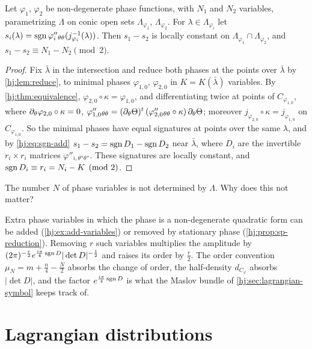 \begin{corollary}\label{hj:cor:signature}
  Let $\varphi_1$, $\varphi_2$ be non-degenerate phase functions, with $N_1$ and
  $N_2$ variables, parametrizing $\Lambda$ on conic open sets
  $\Lambda_{\varphi_1}$, $\Lambda_{\varphi_2}$.  For
  $\lambda\in\Lambda_{\varphi_i}$ let $s_i(\lambda)=\operatorname{sgn}\varphi_i''{}_{\theta\theta}
  (j_{\varphi_i}^{-1}(\lambda))$.  Then $s_1-s_2$ is locally constant on
  $\Lambda_{\varphi_1}\cap\Lambda_{\varphi_2}$, and
  $s_1-s_2\equiv N_1-N_2\pmod 2$.
\end{corollary}
\begin{proof}
  Fix $\bar\lambda$ in the intersection and reduce both phases at the points
  over $\bar\lambda$ by \cref{hj:lem:reduce}, to minimal phases
  $\varphi_{1,0}$, $\varphi_{2,0}$ in $K=K(\bar\lambda)$ variables.  By
  \cref{hj:thm:equivalence}, $\varphi_{2,0}\circ\kappa=\varphi_{1,0}$, and
  differentiating twice at points of $C_{\varphi_{1,0}}$, where
  $\partial_\theta\varphi_{2,0}\circ\kappa=0$,
  $\varphi_{1,0}''{}_{\theta\theta}=(\partial_\theta\Theta)^t\,(\varphi_{2,0}''{}_{\theta\theta}
  \circ\kappa)\,\partial_\theta\Theta$; moreover $j_{\varphi_{2,0}}\circ\kappa=
  j_{\varphi_{1,0}}$ on $C_{\varphi_{1,0}}$.  So the minimal phases have equal
  signatures at points over the same $\lambda$, and by \eqref{hj:eq:sgn-add}
  $s_1-s_2=\operatorname{sgn} D_1-\operatorname{sgn} D_2$ near $\bar\lambda$, where $D_i$ are the invertible
  $r_i\times r_i$ matrices $\varphi''_{i,\theta''\theta''}$.  These signatures are
  locally constant, and $\operatorname{sgn} D_i\equiv r_i=N_i-K\pmod2$.
\end{proof}

\begin{question}
The number $N$ of phase variables is not determined by $\Lambda$. Why does this
not matter?
\end{question}
\begin{answer}
Extra phase variables in which the phase is a non-degenerate quadratic form can be
added (\cref{hj:ex:add-variables}) or removed by stationary phase
(\cref{hj:prop:sp-reduction}). Removing $r$ such variables multiplies the amplitude
by $(2\pi)^{-\frac r2}e^{\frac{i\pi}4\operatorname{sgn} D}|\det D|^{-\frac12}$ and raises its order
by $\frac r2$. The order convention $\mu_N=m+\frac n4-\frac N2$ absorbs the change of
order, the half-density $d_{C_\varphi}$ absorbs $|\det D|$, and the factor
$e^{\frac{i\pi}4\operatorname{sgn} D}$ is what the Maslov bundle of
\cref{hj:sec:lagrangian-symbol} keeps track of.
\end{answer}

\section{Lagrangian distributions}\label{hj:sec:lagrangian-dist}

